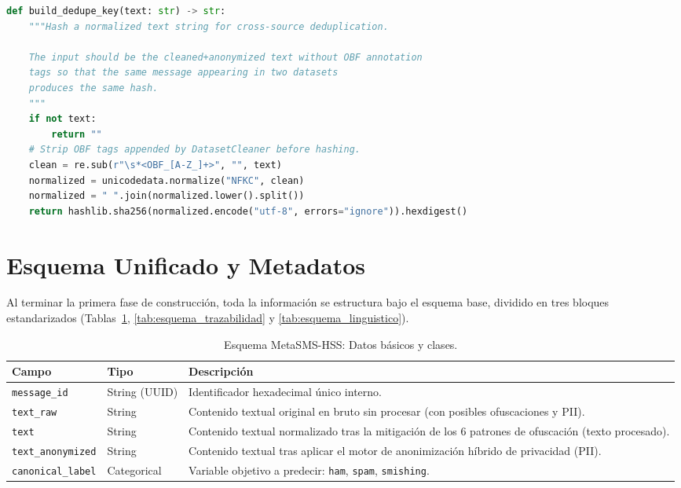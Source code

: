 \begin{lstlisting}[language=Python, caption={Cálculo de la firma criptográfica para deduplicación cruzada.}, label=lst:dedupe]
def build_dedupe_key(text: str) -> str:
    """Hash a normalized text string for cross-source deduplication.

    The input should be the cleaned+anonymized text without OBF annotation
    tags so that the same message appearing in two datasets
    produces the same hash.
    """
    if not text:
        return ""
    # Strip OBF tags appended by DatasetCleaner before hashing.
    clean = re.sub(r"\s*<OBF_[A-Z_]+>", "", text)
    normalized = unicodedata.normalize("NFKC", clean)
    normalized = " ".join(normalized.lower().split())
    return hashlib.sha256(normalized.encode("utf-8", errors="ignore")).hexdigest()
\end{lstlisting}

\section{Esquema Unificado y Metadatos}
\label{sec:esquema_trazabilidad}

Al terminar la primera fase de construcción, toda la información se estructura bajo el esquema base, dividido en tres bloques estandarizados (Tablas~\ref{tab:esquema_core}, \ref{tab:esquema_trazabilidad} y \ref{tab:esquema_linguistico}).

\begin{table}[htbp]
    \centering
    \caption{Esquema MetaSMS-HSS: Datos básicos y clases.}
    \label{tab:esquema_core}
    \small
    \begin{tabular}{llp{7cm}}
        \toprule
        \textbf{Campo} & \textbf{Tipo} & \textbf{Descripción} \\
        \midrule
        \texttt{message\_id} & String (UUID) & Identificador hexadecimal único interno. \\
        \texttt{text\_raw} & String & Contenido textual original en bruto sin procesar (con posibles ofuscaciones y PII). \\
        \texttt{text} & String & Contenido textual normalizado tras la mitigación de los 6 patrones de ofuscación (texto procesado). \\
        \texttt{text\_anonymized} & String & Contenido textual tras aplicar el motor de anonimización híbrido de privacidad (PII). \\
        \texttt{canonical\_label} & Categorical & Variable objetivo a predecir: \texttt{ham}, \texttt{spam}, \texttt{smishing}. \\
        \bottomrule
    \end{tabular}
\end{table}


